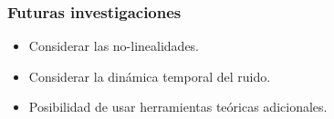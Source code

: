 \documentclass{beamer}
\begin{document}

\begin{frame}
\frametitle{Futuras investigaciones}
\begin{itemize}

\item Considerar las no-linealidades.
\item Considerar la din\'amica temporal del ruido.
\item Posibilidad de usar herramientas te\'oricas adicionales.

\end{itemize}
\end{frame}
\end{document}
